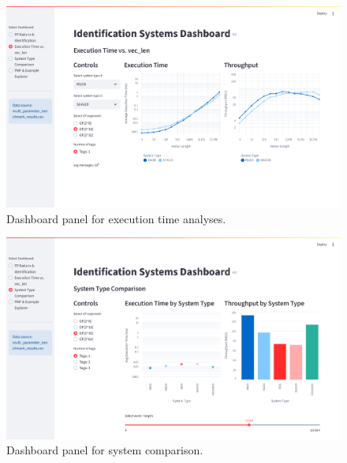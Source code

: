 \documentclass[english,BCOR=4mm,cdfont=false]{tudscrreprt} %
\begin{document}
\begin{figure}[hp]
  \centering
  \includegraphics[width=\textwidth]{images/execution_time_dash.pdf}
  \caption{Dashboard panel for execution time analyses.}
  \label{fig:dashExecTime}
\end{figure}

\begin{figure}[hp]
  \centering
  \includegraphics[width=\textwidth]{images/system_comparison_dash.pdf}
  \caption{Dashboard panel for system comparison.}
  \label{fig:dashSysComp}
\end{figure}
\end{document}
